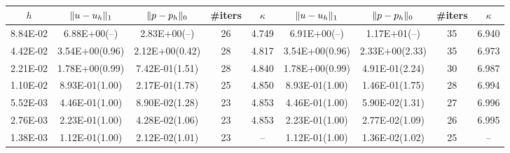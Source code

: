 \documentclass[r]{siamart171218}
\begin{document}
\begin{table}
  \begin{center}
    \footnotesize{
  \begin{tabular}{c|cc|c|c||cc|c|c}
    \hline
    $h$ & $\lVert{u-u_h}\rVert_1$ & $\lVert{p-p_h}\rVert_0$ & \#{iters} & $\kappa$
        & $\lVert{u-u_h}\rVert_1$ & $\lVert{p-p_h}\rVert_0$ & \#{iters} & $\kappa$ \\
    \hline
8.84E-02 & 6.88E+00(--)   & 2.83E+00(--)  & 26 & 4.749  & 6.91E+00(--)   & 1.17E+01(--)  & 35 & 6.940 \\
4.42E-02 & 3.54E+00(0.96) & 2.12E+00(0.42)& 28 & 4.817  & 3.54E+00(0.96) & 2.33E+00(2.33)& 35 & 6.973 \\
2.21E-02 & 1.78E+00(0.99) & 7.42E-01(1.51)& 28 & 4.840  & 1.78E+00(0.99) & 4.91E-01(2.24)& 30 & 6.987 \\
1.10E-02 & 8.93E-01(1.00) & 2.17E-01(1.78)& 25 & 4.850  & 8.93E-01(1.00) & 1.46E-01(1.75)& 28 & 6.994 \\
5.52E-03 & 4.46E-01(1.00) & 8.90E-02(1.28)& 23 & 4.853  & 4.46E-01(1.00) & 5.90E-02(1.31)& 27 & 6.996 \\
2.76E-03 & 2.23E-01(1.00) & 4.28E-02(1.06)& 23 & 4.853  & 2.23E-01(1.00) & 2.77E-02(1.09)& 26 & 6.995 \\
1.38E-03 & 1.12E-01(1.00) & 2.12E-02(1.01)& 23 & --     & 1.12E-01(1.00) & 1.36E-02(1.02)& 25 & --    \\  
    \hline
  \end{tabular}
  }
  \caption{}
  \label{tab:p1_p1}
  \end{center}
\end{table}



%
%
\end{document}
